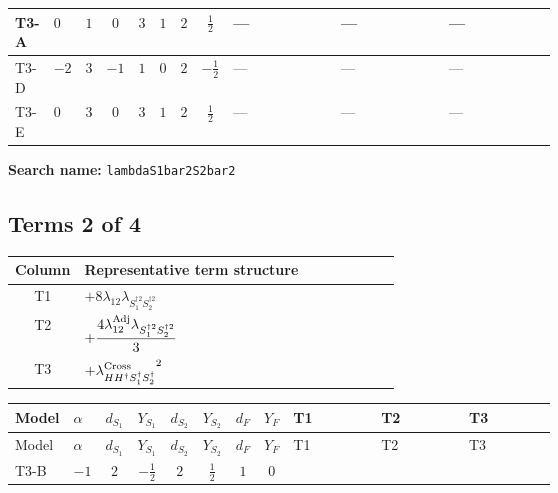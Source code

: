 \documentclass[8pt]{article}
\begin{document}
\begin{landscape}
\begin{longtable}{@{}llcccccc >{\raggedright\arraybackslash}p{0.21\linewidth} >{\raggedright\arraybackslash}p{0.21\linewidth} >{\raggedright\arraybackslash}p{0.21\linewidth}@{}}
\midrule
T3-A & $0$ & $1$ & $0$ & $3$ & $1$ & $2$ & $\frac{1}{2}$ & --- & --- & --- \\
\midrule
T3-D & $-2$ & $3$ & $-1$ & $1$ & $0$ & $2$ & $-\frac{1}{2}$ & --- & --- & --- \\
\midrule
T3-E & $0$ & $3$ & $0$ & $3$ & $1$ & $2$ & $\frac{1}{2}$ & --- & --- & --- \\
\midrule
\bottomrule
\end{longtable}
\clearpage
\noindent\textbf{Search name: }\texttt{lambdaS1bar2S2bar2}\par\smallskip
\subsection*{Terms 2 of 4}
\begin{center}
\begin{tabular}{@{}c >{\raggedright\arraybackslash}p{0.82\linewidth}@{}}
\toprule
Column & Representative term structure \\
\midrule
T1 & \(\displaystyle +8 {\lambda_{12}} {\lambda_{S_1^{\dagger 2}S_2^{\dagger 2}}}\) \\
\midrule
T2 & \(\displaystyle +\frac{4 {\lambda_{12}^{\rm Adj}} {\lambda_{S_1^{\dagger 2}S_2^{\dagger 2}}}}{3}\) \\
\midrule
T3 & \(\displaystyle +{\lambda_{H H^\dagger S_1^\dagger S_2^\dagger}^{\rm Cross}}^2\) \\
\midrule
\bottomrule
\end{tabular}
\end{center}
\smallskip
\tiny
\begin{longtable}{@{}llcccccc >{\raggedright\arraybackslash}p{0.21\linewidth} >{\raggedright\arraybackslash}p{0.21\linewidth} >{\raggedright\arraybackslash}p{0.21\linewidth}@{}}
\toprule
Model & $\alpha$ & $d_{S_1}$ & $Y_{S_1}$ & $d_{S_2}$ & $Y_{S_2}$ & $d_F$ & $Y_F$ & T1 & T2 & T3 \\
\midrule
\endfirsthead
\toprule
Model & $\alpha$ & $d_{S_1}$ & $Y_{S_1}$ & $d_{S_2}$ & $Y_{S_2}$ & $d_F$ & $Y_F$ & T1 & T2 & T3 \\
\midrule
\endhead
T3-B & $-1$ & $2$ & $-\frac{1}{2}$ & $2$ & $\frac{1}{2}$ & $1$ & $0$ & \scriptsize\adjustbox{max width=\linewidth}{$\begin{gathered} +8 {\lambda_{12}} {\lambda_{S_1^{\dagger 2}S_2^{\dagger 2}}}\end{gathered}$} & \scriptsize\adjustbox{max width=\linewidth}{$\begin{gathered} +\frac{4 {\lambda_{12}^{\rm Adj}} {\lambda_{S_1^{\dagger 2}S_2^{\dagger 2}}}}{3}\end{gathered}$} & \scriptsize\adjustbox{max width=\linewidth}{$\begin{gathered} +{\lambda_{H H^\dagger S_1^\dagger S_2^\dagger}^{\rm Cross}}^2\end{gathered}$} \\

\end{longtable}
\end{landscape}
\end{document}
